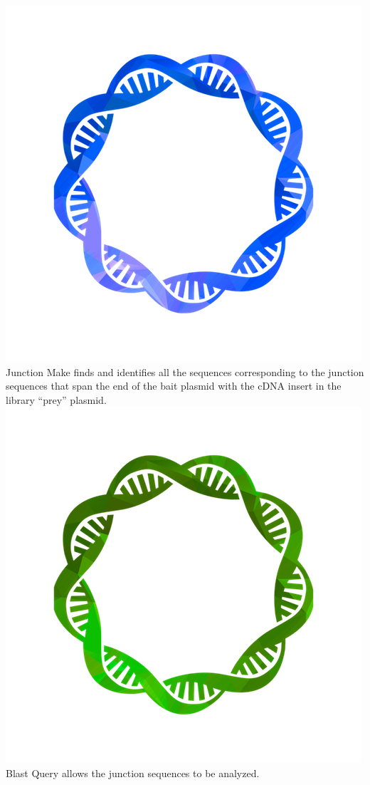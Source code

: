 \documentclass[11pt,fleqn]{book} %
\newcommand{\JunctionMake}{{\color{Blue} Junction Make }}
\newcommand{\BlastQuery}{{\color{ForestGreen} Blast Query }}
\begin{document}
\includegraphics[scale=0.3]{Pictures/junction_make.png} \JunctionMake finds and identifies all the sequences corresponding to the junction sequences that span the end of the bait plasmid with the cDNA insert in the library “prey” plasmid.\\

\includegraphics[scale=0.3]{Pictures/query_blast.png} \BlastQuery allows the junction sequences to be analyzed.\\
\end{document}
